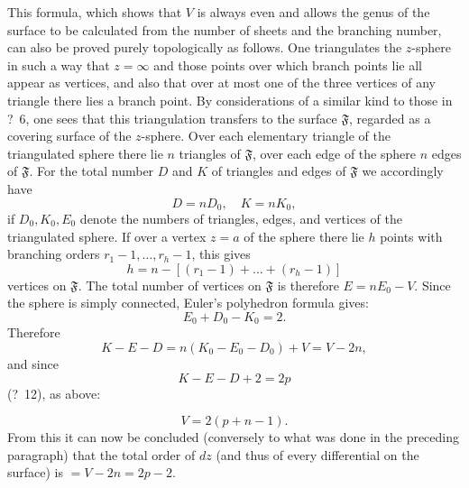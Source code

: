 \documentclass{article}
\begin{document}
This formula, which shows that $V$ is always even and allows the genus of the surface to be calculated from the number of sheets and the branching number, can also be proved purely topologically as follows. One triangulates the $z$-sphere in such a way that $z = \infty$ and those points over which branch points lie all appear as vertices, and also that over at most one of the three vertices of any triangle there lies a branch point. By considerations of a similar kind to those in ?~6, one sees that this triangulation transfers to the surface $\mathfrak{F}$, regarded as a covering surface of the $z$-sphere. Over each elementary triangle of the triangulated sphere there lie $n$ triangles of $\mathfrak{F}$, over each edge of the sphere $n$ edges of $\mathfrak{F}$. For the total number $D$ and $K$ of triangles and edges of $\mathfrak{F}$ we accordingly have
\[ D = n D_0, \quad K = n K_0, \]
if $D_0, K_0, E_0$ denote the numbers of triangles, edges, and vertices of the triangulated sphere. If over a vertex $z = a$ of the sphere there lie $h$ points with branching orders $r_1 - 1, \dots, r_h - 1$, this gives
\[ h = n - [(r_1 - 1) + \dots + (r_h - 1)] \]
vertices on $\mathfrak{F}$. The total number of vertices on $\mathfrak{F}$ is therefore $E = n E_0 - V$. Since the sphere is simply connected, Euler's polyhedron formula gives:
\[ E_0 + D_0 - K_0 = 2. \]
Therefore
\[ K - E - D = n(K_0 - E_0 - D_0) + V = V - 2n, \]
and since
\[ K - E - D + 2 = 2p \]
(?~12), as above:

\[ V = 2(p + n - 1). \]
From this it can now be concluded (conversely to what was done in the preceding paragraph) that the total order of $dz$ (and thus of every differential on the surface) is $= V - 2n = 2p - 2$.
\end{document}
